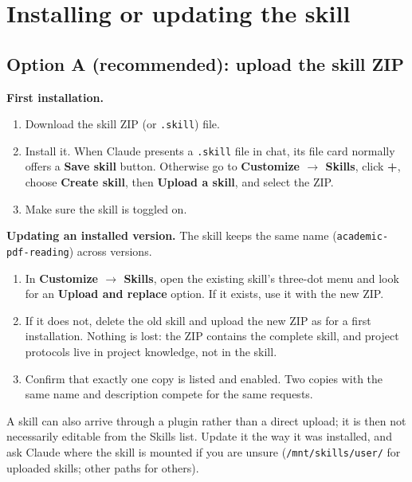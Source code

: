 \documentclass[11pt,a4paper]{article}
\newcommand{\file}[1]{\texttt{#1}}
\begin{document}
\section{Installing or updating the skill}

\subsection{Option A (recommended): upload the skill ZIP}

\textbf{First installation.}
\begin{enumerate}
  \item Download the skill ZIP (or \file{.skill}) file.
  \item Install it. When Claude presents a \file{.skill} file in chat, its
  file card normally offers a \textbf{Save skill} button. Otherwise go to
  \textbf{Customize $\rightarrow$ Skills}, click \textbf{+}, choose
  \textbf{Create skill}, then \textbf{Upload a skill}, and select the ZIP.
  \item Make sure the skill is toggled on.
\end{enumerate}

\textbf{Updating an installed version.} The skill keeps the same name
(\texttt{academic-pdf-reading}) across versions.
\begin{enumerate}
  \item In \textbf{Customize $\rightarrow$ Skills}, open the existing
  skill's three-dot menu and look for an \textbf{Upload and replace} option.
  If it exists, use it with the new ZIP.
  \item If it does not, delete the old skill and upload the new ZIP as for a
  first installation. Nothing is lost: the ZIP contains the complete skill,
  and project protocols live in project knowledge, not in the skill.
  \item Confirm that exactly one copy is listed and enabled. Two copies with
  the same name and description compete for the same requests.
\end{enumerate}

\begin{caution}
A skill can also arrive through a plugin rather than a direct upload; it is
then not necessarily editable from the Skills list. Update it the way it was
installed, and ask Claude where the skill is mounted if you are unsure
(\file{/mnt/skills/user/} for uploaded skills; other paths for others).
\end{caution}
\end{document}
